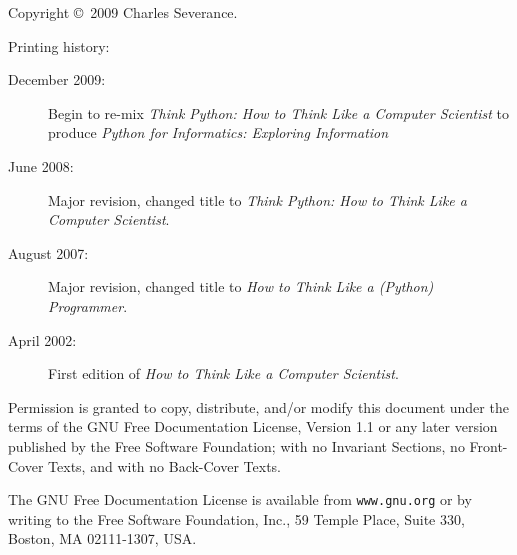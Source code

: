 \documentclass[10pt]{book}
\begin{document}
\begin{latexonly}
\begin{flushright}



\vfill

\end{flushright}


\pagebreak
\thispagestyle{empty}

{\small
Copyright \copyright ~2009 Charles Severance.


Printing history:

\begin{description}

\item[December 2009:] Begin to re-mix 
{\em Think Python: How to Think Like
a Computer Scientist}
to produce 
{\em Python for Informatics: Exploring Information}

\item[June 2008:] Major revision, changed title to
{\em Think Python: How to Think Like
a Computer Scientist}.

\item[August 2007:] Major revision, changed title to
{\em How to Think Like a (Python) Programmer}.

\item[April 2002:] First edition of {\em How to Think Like
a Computer Scientist}.

\end{description}

\vspace{0.2in}


Permission is granted to copy, distribute, and/or modify this document
under the terms of the GNU Free Documentation License, Version 1.1 or
any later version published by the Free Software Foundation; with no
Invariant Sections, no Front-Cover Texts, and with no Back-Cover Texts.

The GNU Free Documentation License is available from {\tt www.gnu.org}
or by writing to the Free Software Foundation, Inc., 59 Temple Place,
Suite 330, Boston, MA 02111-1307, USA.

}
\end{latexonly}
\end{document}
